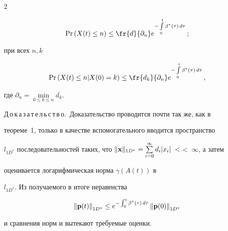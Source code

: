 \begin{multicols}{2}
{\begin{equation}
\Pr \left(X(t) \le n \right) \leq \fr{d}{{\partial}_n}


e^{-\int\limits_0^t \beta^* (\tau)\, d\tau}\,; 


\label{30002} 


\end{equation}





\noindent при всех $n, k$


\begin{equation}


\Pr \left(X(t) \le n | X(0) = k \right) \leq


\fr{d_k}{{\partial}_n} e^{-\int\limits_0^t \beta^* (\tau)\, d\tau}\,,


\label{30003}


\end{equation}


где ${\partial}_n = \min\limits_{0 \le k \le n} d_k$.  }





\medskip





\noindent


Д\,о\,к\,а\,з\,а\,т\,е\,л\,ь\,с\,т\,в\,о.~Доказательство проводится почти так же, как в


теореме~1, только в качестве вспомогательного вводится пространство


$l_{1D^*}$  последовательностей таких, что   $\|{\bf


x}\|_{1D^*}=\sum\limits_{i=0}^{\infty}d_{i}|x_{i}|\;<$\linebreak $<\;\infty$, а затем


оценивается логарифмическая норма $\gamma \left(A(t)\right)$ в


$l_{1D^*}$. Из получаемого в итоге неравенства


\begin{equation*}


\left\|{\bf p}(t)\right\|_{1D^*} \le  e^{-\int_0^t  \beta^* (\tau)\,


d\tau}\left\|{\bf p}(0)\right\|_{1D^*} 




\end{equation*}


и сравнения норм и вытекают требуемые оценки.






\end{multicols}
